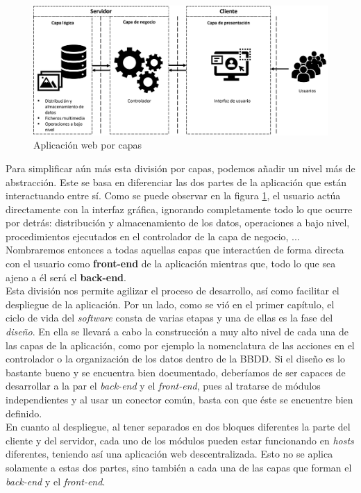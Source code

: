 \documentclass[../main.tex]{subfiles}
\begin{document}
    \begin{figure}[!h]
          \centering
          \includegraphics[width=\textwidth]{images/estructura_aplicacion_web.png}
          \caption{Aplicación web por capas}
          \label{fig:web_capas}
      \end{figure}
      
    Para simplificar aún más esta división por capas, podemos añadir un nivel más de abstracción. Este se basa en diferenciar las dos partes de la aplicación que están interactuando entre sí. Como se puede observar en la figura \ref{fig:web_capas}, el usuario actúa directamente con la interfaz gráfica, ignorando completamente todo lo que ocurre por detrás: distribución y almacenamiento de los datos, operaciones a bajo nivel, procedimientos ejecutados en el controlador de la capa de negocio, ... Nombraremos entonces a todas aquellas capas que interactúen de forma directa con el usuario como \textbf{front-end} de la aplicación mientras que, todo lo que sea ajeno a él será el \textbf{back-end}. \\
    
    Esta división nos permite agilizar el proceso de desarrollo, así como facilitar el despliegue de la aplicación. Por un lado, como se vió en el primer capítulo, el ciclo de vida del \textit{software} consta de varias etapas y una de ellas es la fase del \textit{diseño}. En ella se llevará a cabo la construcción a muy alto nivel de cada una de las capas de la aplicación, como por ejemplo la nomenclatura de las acciones en el controlador o la organización de los datos dentro de la BBDD. Si el diseño es lo bastante bueno y se encuentra bien documentado, deberíamos de ser capaces de desarrollar a la par el \textit{back-end} y el \textit{front-end}, pues al tratarse de módulos independientes y al usar un conector común, basta con que éste se encuentre bien definido.\\ 
    
    En cuanto al despliegue, al tener separados en dos bloques diferentes la parte del cliente y del servidor, cada uno de los módulos pueden estar funcionando en \textit{hosts} diferentes, teniendo así una aplicación web descentralizada. Esto no se aplica solamente a estas dos partes, sino también a cada una de las capas que forman el \textit{back-end} y el \textit{front-end}. \\
    
\end{document}
